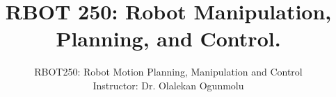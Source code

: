 \documentclass[doublespacing]{brandeis}
\author{RBOT250: Robot Motion Planning, Manipulation and Control \\
	Instructor: Dr. Olalekan Ogunmolu}
\title{RBOT 250: Robot Manipulation, Planning, and Control.
}
\numberwithin{equation}{section}
\theoremstyle{definition}
\begin{document}
	
	\frontmatter
	
	
	\tableofcontents
	\listoffigures %
	\listoftables %
	
	\mainmatter
%



\newpage




%

%
%
\providecommand\BIBentryALTinterwordstretchfactor{2.5}


\end{document}
